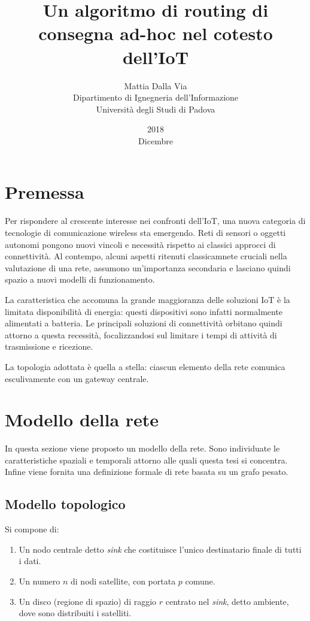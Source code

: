 \documentclass[a4paper,12pt]{article}
\title{Un algoritmo di routing di consegna ad-hoc nel cotesto dell'IoT}
\date{2018\\ Dicembre}
\author{Mattia Dalla Via\\ Dipartimento di Ignegneria dell'Informazione\\ Università degli Studi di Padova}
\theoremstyle{definition}
\begin{document}
\maketitle

\tableofcontents

\section{Premessa}


Per rispondere al crescente interesse nei confronti dell'IoT, una nuova categoria di tecnologie di comunicazione wireless sta emergendo. Reti di sensori o oggetti autonomi pongono nuovi vincoli e necessità rispetto ai classici approcci di connettività. Al contempo, alcuni aspetti ritenuti classicamnete cruciali nella valutazione di una rete, assumono un'importanza secondaria e lasciano quindi spazio a nuovi modelli di funzionamento.


La caratteristica che accomuna la grande maggioranza delle soluzioni IoT è la limitata disponibilità di energia: questi dispositivi sono infatti normalmente alimentati a batteria. Le principali soluzioni di connettività orbitano quindi attorno a questa recessità, focalizzandosi sul limitare i tempi di attività di trasmissione e ricezione.

La topologia adottata è quella a stella: ciascun elemento della rete comunica esculivamente con un gateway centrale.

\section{Modello della rete}

In questa sezione viene proposto un modello della rete. Sono individuate le caratteristiche spaziali e temporali attorno alle quali questa tesi si concentra. Infine viene fornita una definizione formale di rete basata su un grafo pesato.

\subsection{Modello topologico}

Si compone di:

\begin{enumerate}
\item Un nodo centrale detto \emph{sink} che costituisce l'unico destinatario finale di tutti i dati.
\item Un numero $n$ di nodi satellite, con portata $p$ comune.
\item Un disco (regione di spazio) di raggio $r$ centrato nel \emph{sink}, detto ambiente, dove sono distribuiti i satelliti.
\end{enumerate}
\end{document}

